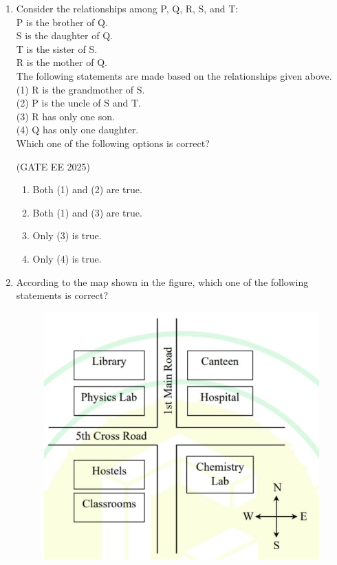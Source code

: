 \documentclass[journal,12pt,onecolumn]{IEEEtran}
\theoremstyle{remark}
\begin{document}
\begin{enumerate}
\hfill(GATE EE 2025)

\begin{multicols}{4}
\begin{enumerate}
\item 25
\item 28
\item 30
\item 32
\end{enumerate}
\end{multicols}

\item Consider the relationships among P, Q, R, S, and T:\\  
 P is the brother of Q.\\  
 S is the daughter of Q.\\  
 T is the sister of S. \\
 R is the mother of Q. \\ 
The following statements are made based on the relationships given above.\\  
(1) R is the grandmother of S.  \\
(2) P is the uncle of S and T.  \\
(3) R has only one son.  \\
(4) Q has only one daughter.\\  
Which one of the following options is correct?

\hfill(GATE EE 2025)

\begin{multicols}{2}
\begin{enumerate}
\item Both (1) and (2) are true.
\item Both (1) and (3) are true.
\item Only (3) is true.
\item Only (4) is true.
\end{enumerate}
\end{multicols}
\newpage
\item According to the map shown in the figure, which one of the following statements is correct?  \\
\begin{figure}
    \centering
    \includegraphics[width=0.3\linewidth]{figs/Fig 1.jpg}
    \caption{}
    \label{fig:placeholder}
\end{figure}


\end{enumerate}
\end{document}
